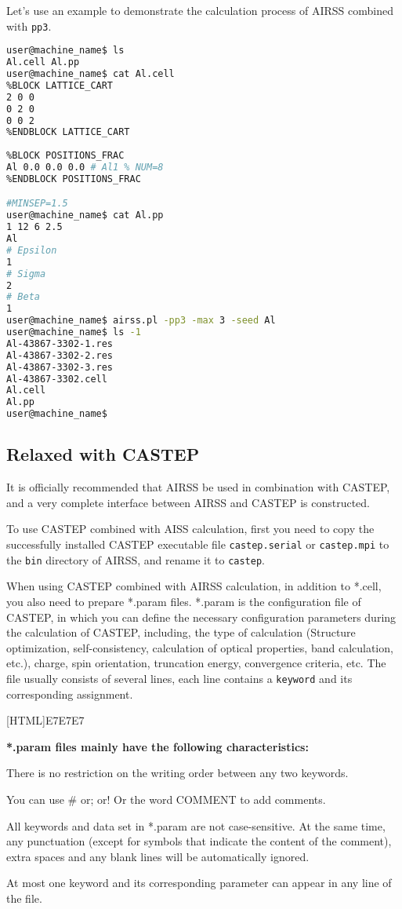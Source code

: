 \documentclass[a4paper, 10pt]{article}
\begin{document}
Let's use an example to demonstrate the calculation process of AIRSS combined with \verb|pp3|.
\begin{lstlisting}[language={bash}]
user@machine_name$ ls 
Al.cell Al.pp
user@machine_name$ cat Al.cell
%BLOCK LATTICE_CART
2 0 0
0 2 0
0 0 2 
%ENDBLOCK LATTICE_CART
 
%BLOCK POSITIONS_FRAC
Al 0.0 0.0 0.0 # Al1 % NUM=8
%ENDBLOCK POSITIONS_FRAC

#MINSEP=1.5
user@machine_name$ cat Al.pp
1 12 6 2.5
Al
# Epsilon
1
# Sigma
2
# Beta
1
user@machine_name$ airss.pl -pp3 -max 3 -seed Al
user@machine_name$ ls -1
Al-43867-3302-1.res
Al-43867-3302-2.res
Al-43867-3302-3.res
Al-43867-3302.cell
Al.cell
Al.pp
user@machine_name$
\end{lstlisting}

\subsection{Relaxed with CASTEP}
It is officially recommended that AIRSS be used in combination with CASTEP, and a very complete interface between AIRSS and CASTEP is constructed.

To use CASTEP combined with AISS calculation, first you need to copy the successfully installed CASTEP executable file \verb|castep.serial| or \verb|castep.mpi| to the \verb|bin| directory of AIRSS, and rename it to \verb|castep|.

When using CASTEP combined with AIRSS calculation, in addition to *.cell, you also need to prepare *.param files. *.param is the configuration file of CASTEP, in which you can define the necessary configuration parameters during the calculation of CASTEP, including, the type of calculation (Structure optimization, self-consistency, calculation of optical properties, band calculation, etc.), charge, spin orientation, truncation energy, convergence criteria, etc. The file usually consists of several lines, each line contains a \verb|keyword| and its corresponding assignment.

\noindent{}[HTML]{E7E7E7}{\parbox{\textwidth}{%
\noindent \textbf{*.param files mainly have the following characteristics:}
\begin{maineu}
\item There is no restriction on the writing order between any two keywords.
\item You can use \# or; or! Or the word COMMENT to add comments.
\item All keywords and data set in *.param are not case-sensitive. At the same time, any punctuation (except for symbols that indicate the content of the comment), extra spaces and any blank lines will be automatically ignored.
\item At most one keyword and its corresponding parameter can appear in any line of the file.
\end{maineu}}}\\
\end{document}
